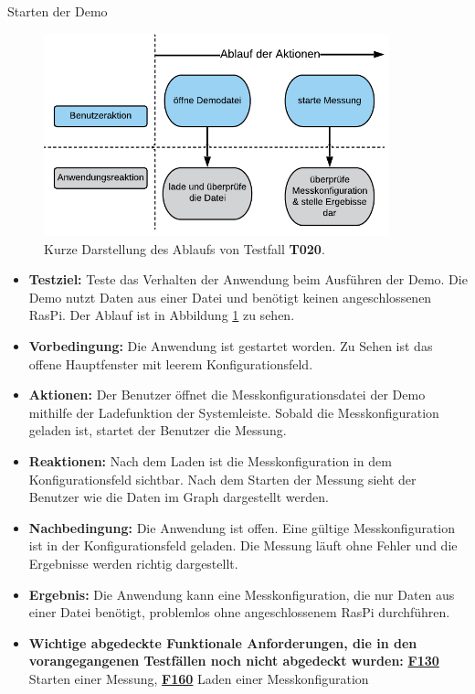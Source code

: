 \documentclass[parskip=full]{scrartcl}
\begin{document}
\begin{description}
\begin{itemize}
\end{itemize}


\hypertarget{link-t020}{\item[T020]} Starten der Demo 

\begin{figure}[htbp]
	\begin{center}
		\includegraphics[width = 10cm]{Grafik/T020-Ablauf.png}
		\caption{Kurze Darstellung des Ablaufs von Testfall \textbf{T020}.}
		\label{T020-Ablauf}
	\end{center}
\end{figure}
\begin{itemize}

\item []\textbf{Testziel:} Teste das Verhalten der Anwendung beim Ausführen der Demo. Die Demo nutzt Daten aus einer Datei und benötigt keinen angeschlossenen \gls{RasPi}. Der Ablauf ist in Abbildung \ref{T020-Ablauf} zu sehen.

\item []\textbf{Vorbedingung:} Die Anwendung ist gestartet worden. Zu Sehen ist das offene Hauptfenster mit leerem Konfigurationsfeld.
\item []\textbf{Aktionen:} Der Benutzer öffnet die Messkonfigurationsdatei der Demo mithilfe der Ladefunktion der Systemleiste. Sobald die Messkonfiguration geladen ist, startet der Benutzer die Messung.
\item []\textbf{Reaktionen:} Nach dem Laden ist die Messkonfiguration in dem Konfigurationsfeld sichtbar. Nach dem Starten der Messung sieht der Benutzer wie die Daten im Graph dargestellt werden.
\item []\textbf{Nachbedingung:} Die Anwendung ist offen. Eine gültige Messkonfiguration ist in der Konfigurationsfeld geladen. Die Messung läuft ohne Fehler und die Ergebnisse werden richtig dargestellt.

\item []\textbf{Ergebnis:} Die Anwendung kann eine Messkonfiguration, die nur Daten aus einer Datei benötigt, problemlos ohne angeschlossenem \gls{RasPi} durchführen. 
\item []\textbf{Wichtige abgedeckte Funktionale Anforderungen, die in den vorangegangenen Testfällen noch nicht abgedeckt wurden:} \hyperlink{link-f130}{\textbf{F130}} Starten einer Messung, \hyperlink{link-f160}{\textbf{F160}} Laden einer Messkonfiguration


\end{itemize}
\end{description}
\end{document}
